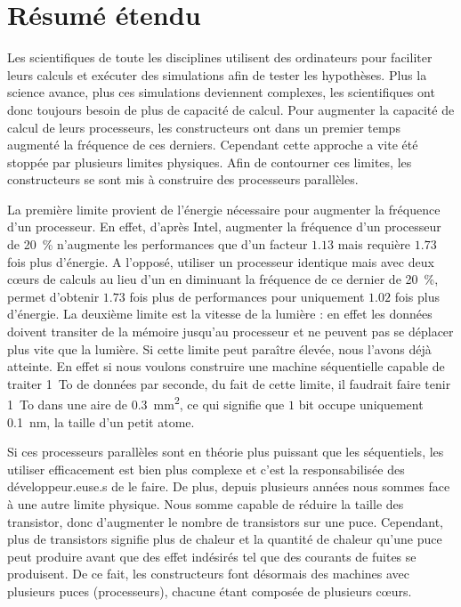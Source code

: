
\chapter{Résumé étendu}

Les scientifiques de toute les disciplines utilisent des ordinateurs pour faciliter leurs calculs et exécuter des simulations afin de tester les hypothèses.
Plus la science avance, plus ces simulations deviennent complexes, les scientifiques ont donc toujours besoin de plus de capacité de calcul.
Pour augmenter la capacité de calcul de leurs processeurs, les constructeurs ont dans un premier temps augmenté la fréquence de ces derniers.
Cependant cette approche a vite été stoppée par plusieurs limites physiques.
Afin de contourner ces limites, les constructeurs se sont mis à construire des processeurs parallèles.

La première limite provient de l'énergie nécessaire pour augmenter la fréquence d'un processeur.
En effet, d'après \gls{Intel}, augmenter la fréquence d'un processeur de \SI{20}{\%} n'augmente les performances que d'un facteur $1.13$ mais requière $1.73$ fois plus d'énergie.
A l'opposé, utiliser un processeur identique mais avec deux cœurs de calculs au lieu d'un en diminuant la fréquence de ce dernier de \SI{20}{\%}, permet d'obtenir $1.73$ fois plus de performances pour uniquement $1.02$ fois plus d'énergie.
La deuxième limite est la vitesse de la lumière : en effet les données doivent transiter de la mémoire jusqu'au processeur et ne peuvent pas se déplacer plus vite que la lumière.
Si cette limite peut paraître élevée, nous l'avons déjà atteinte.
En effet si nous voulons construire une machine séquentielle capable de traiter \SI{1}{To} de données par seconde, du fait de cette limite, il faudrait faire tenir \SI{1}{To} dans une aire de \SI{0.3}{mm^2}, ce qui signifie que $1$ bit occupe uniquement \SI{0.1}{nm}, la taille d'un petit atome.

Si ces processeurs parallèles sont en théorie plus puissant que les séquentiels, les utiliser efficacement est bien plus complexe et c'est la responsabilisée des développeur.euse.s de le faire.
De plus, depuis plusieurs années nous sommes face à une autre limite physique.
Nous somme capable de réduire la taille des transistor, donc d'augmenter le nombre de transistors sur une puce.
Cependant, plus de transistors signifie plus de chaleur et la quantité de chaleur qu'une puce peut produire avant que des effet indésirés tel que des courants de fuites se produisent.
De ce fait, les constructeurs font désormais des machines avec plusieurs puces (processeurs), chacune étant composée de plusieurs cœurs.


